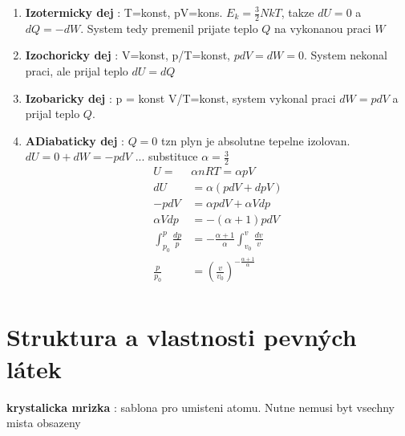 \documentclass{report}
\begin{document}
\begin{enumerate}[label=\bfseries\tiny\protect\circled{\small\arabic*}]
  \item \textbf{Izotermicky dej} : T=konst, pV=kons. $E_k=\frac{3}{2}NkT$, takze $dU=0$ a $dQ=-dW$. System tedy premenil prijate teplo $Q$ na vykonanou praci $W$
  \item \textbf{Izochoricky dej} : V=konst, p/T=konst, $pdV=dW=0$. System nekonal praci, ale prijal teplo $dU=dQ$
  \item \textbf{Izobaricky dej} : p = konst V/T=konst, system vykonal praci $dW=pdV$ a prijal teplo $Q$.
  \item \textbf{ADiabaticky dej} : $Q = 0$ tzn plyn je absolutne tepelne izolovan. \\
      $dU=0+dW=-pdV$ \hspace{5cm} ... substituce $\alpha=\frac{3}{2}$ \\
\begin{align*}
  U=&\alpha nRT=\alpha pV \\
  dU&=\alpha (pdV+dpV) \\
  -pdV&=\alpha pdV+\alpha Vdp \\
  \alpha Vdp&=-(\alpha +1)pdV \\
  \int_{p_0}^{p} \frac{dp}{p}&=-\frac{\alpha+1}{\alpha}\int_{v_0}^{v} \frac{dv}{v} \\
  \frac{p}{p_0}&=(\frac{v}{v_0})^{-\frac{\alpha+1}{\alpha}} \\
\end{align*}
\end{enumerate}

\newpage


\section{Struktura a vlastnosti pevných látek}
\textbf{krystalicka mrizka} : sablona pro umisteni atomu. Nutne nemusi byt vsechny mista obsazeny\\
\end{document}
